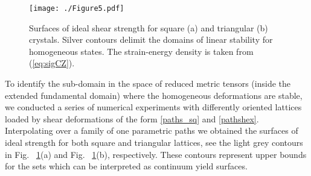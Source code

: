 \documentclass[CRPHYS,Unicode,manuscript]{cedram}
\begin{document}
  
  
   
 

\begin{figure}[h!]
\centering
\texttt{[image: ./Figure5.pdf]}
\caption{\scriptsize {Surfaces of ideal shear strength for square (a) and triangular (b)  crystals. Silver contours delimit the domains of linear stability for   homogeneous states.   The strain-energy density is taken from  (\ref{eq:sigCZ}).
}
 \label{fig:detc1en_ys}}
\end{figure} 
 
To identify the sub-domain in the space of reduced metric tensors  (inside the extended fundamental domain)  where  the  homogeneous  deformations are stable, we conducted a series of numerical experiments with differently oriented lattices   loaded by  shear deformations of the form  \eqref{paths_sq} and \eqref{pathshex}. Interpolating over a family of   one parametric paths we obtained  the surfaces of ideal strength for both square and triangular lattices, see  the light grey contours   in Fig. ~\ref{fig:detc1en_ys}(a) and  Fig. ~\ref{fig:detc1en_ys}(b), respectively. These contours represent   upper bounds for the sets which can be interpreted as  continuum yield surfaces.
\end{document}
